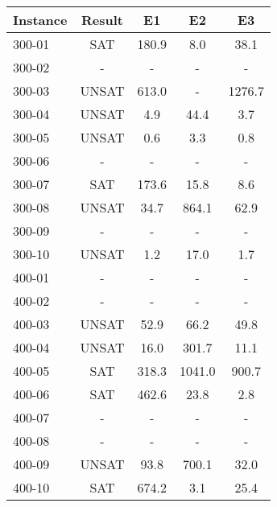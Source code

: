 \begin{tabular}{ lc|ccc }
Instance &Result &E1	    &E2	    &E3 \\
    \hline
300-01	&SAT	&180.9	&8.0	&38.1\\
300-02	&-	&-	&-	&-\\
300-03	&UNSAT	&613.0	&-	&1276.7\\
300-04	&UNSAT	&4.9	&44.4	&3.7\\
300-05	&UNSAT	&0.6	&3.3	&0.8\\
300-06	&-	&-	&-	&-\\
300-07	&SAT	&173.6	&15.8	&8.6\\
300-08	&UNSAT	&34.7	&864.1	&62.9\\
300-09	&-	&-	&-	&-\\
300-10	&UNSAT	&1.2	&17.0	&1.7\\
400-01	&-	&-	&-	&-\\
400-02	&-	&-	&-	&-\\
400-03	&UNSAT	&52.9	&66.2	&49.8\\
400-04	&UNSAT	&16.0	&301.7	&11.1\\
400-05	&SAT	&318.3	&1041.0	&900.7\\
400-06	&SAT	&462.6	&23.8	&2.8\\
400-07	&-	&-	&-	&-\\
400-08	&-	&-	&-	&-\\
400-09	&UNSAT	&93.8	&700.1	&32.0\\
400-10	&SAT	&674.2	&3.1	&25.4\\
    \hline
\end{tabular}
